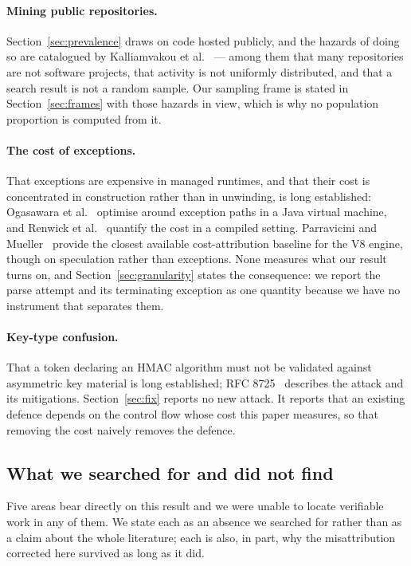 \documentclass[pdflatex,sn-basic,twocolumn]{sn-jnl}%
\begin{document}
\paragraph{Mining public repositories.} Section~\ref{sec:prevalence} draws on
code hosted publicly, and the hazards of doing so are catalogued by
Kalliamvakou et al.~\cite{kalliamvakou2014promises} --- among them that many
repositories are not software projects, that activity is not uniformly
distributed, and that a search result is not a random sample. Our sampling
frame is stated in Section~\ref{sec:frames} with those hazards in view, which
is why no population proportion is computed from it.

\paragraph{The cost of exceptions.} That exceptions are expensive in managed
runtimes, and that their cost is concentrated in construction rather than in
unwinding, is long established: Ogasawara et al.~\cite{ogasawara2006edo}
optimise around exception paths in a Java virtual machine, and Renwick et
al.~\cite{renwick2019lowcost} quantify the cost in a compiled setting.
Parravicini and Mueller~\cite{parravicini2021cost} provide the closest
available cost-attribution baseline for the V8 engine, though on speculation
rather than exceptions. None measures what our result turns on, and
Section~\ref{sec:granularity} states the consequence: we report the parse
attempt and its terminating exception as one quantity because we have no
instrument that separates them.

\paragraph{Key-type confusion.} That a token declaring an HMAC algorithm must
not be validated against asymmetric key material is long established; RFC
8725~\cite{rfc8725} describes the attack and its mitigations.
Section~\ref{sec:fix} reports no new attack. It reports that an existing
defence depends on the control flow whose cost this paper measures, so that
removing the cost naively removes the defence.

\subsection{What we searched for and did not find}\label{sec:gaps}

Five areas bear directly on this result and we were unable to locate verifiable
work in any of them. We state each as an absence we searched for rather than as
a claim about the whole literature; each is also, in part, why the
misattribution corrected here survived as long as it did.
\end{document}
